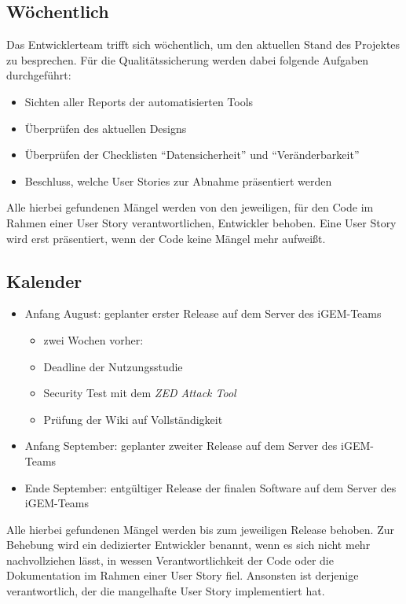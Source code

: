 \documentclass[accentcolor=tud0b,12pt,paper=a4]{tudreport}
\begin{document}
\subsection{Wöchentlich}
Das Entwicklerteam trifft sich wöchentlich, um den aktuellen Stand des Projektes zu besprechen. Für die Qualitätssicherung werden dabei folgende Aufgaben durchgeführt:
\begin{itemize}
	\item Sichten aller Reports der automatisierten Tools
	\item Überprüfen des aktuellen Designs
	\item Überprüfen der Checklisten "`Datensicherheit"' und "`Veränderbarkeit"'
	\item Beschluss, welche User Stories zur Abnahme präsentiert werden
\end{itemize}

Alle hierbei gefundenen Mängel werden von den jeweiligen, für den Code im Rahmen einer User Story verantwortlichen, Entwickler behoben. Eine User Story wird erst präsentiert, wenn der Code keine Mängel mehr aufweißt.

\subsection{Kalender}
\begin{itemize}
	\item Anfang August: geplanter erster Release auf dem Server des iGEM-Teams
	\begin{itemize}
		\item zwei Wochen vorher:
		\item Deadline der Nutzungsstudie
		\item Security Test mit dem \emph{ZED Attack Tool}
		\item Prüfung der Wiki auf Vollständigkeit
	\end{itemize}
	\item Anfang September: geplanter zweiter Release auf dem Server des iGEM-Teams
	\item Ende September: entgültiger Release der finalen Software auf dem Server des iGEM-Teams
\end{itemize}

Alle hierbei gefundenen Mängel werden bis zum jeweiligen Release behoben. Zur Behebung wird ein dedizierter Entwickler benannt, wenn es sich nicht mehr nachvollziehen lässt, in wessen Verantwortlichkeit der Code oder die Dokumentation im Rahmen einer User Story fiel. Ansonsten ist derjenige verantwortlich, der die mangelhafte User Story implementiert hat.
\end{document}
